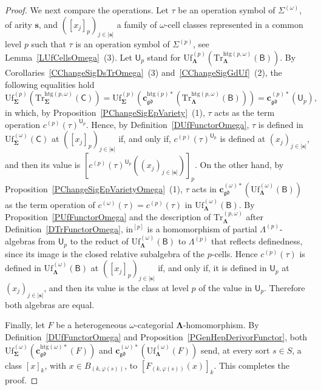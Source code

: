 \documentclass[a4paper, reqno]{amsbook}
\newcommand{\bb}[1]{\ensuremath{\lvert #1 \rvert}}
\newcommand{\sig}[1]{\mathbf{#1}}             %
\newcommand{\calg}[1]{\boldsymbol{\mathsf{#1}}} %
\newcommand{\gd}{\mathfrak{gd}}              %
\newcommand{\htg}{\mathrm{htg}}                %
\newcommand{\Uf}{\mathrm{Uf}}
\newcommand{\Tr}{\mathrm{Tr}}
\theoremstyle{plain}
\theoremstyle{definition}
\begin{document}
\begin{proof}
We next compare the operations.
Let $\tau$ be an operation symbol of $\Sigma^{(\omega)}$, of arity $\mathbf{s}$, and $([x_{j}]_{p})_{j\in\bb{\mathbf{s}}}$ a family of $\omega$-cell classes represented in a common level $p$ such that $\tau$ is an operation symbol of $\Sigma^{(p)}$, see Lemma~\ref{LUfCellsOmega}~(3).
Let $\calg{U}_{p}$ stand for $\Uf^{(p)}_{\sig{\Lambda}}(\Tr^{\htg(p,\omega)}_{\sig{\Lambda}}(\calg{B}))$.
By Corollaries~\ref{CChangeSigDsTrOmega}~(3) and~\ref{CChangeSigGdUf}~(2), the following equalities hold
$$
\Uf^{(p)}_{\sig{\Sigma}}\left(\Tr^{\htg(p,\omega)}_{\sig{\Sigma}}(\calg{C})\right)
=
\Uf^{(p)}_{\sig{\Sigma}}\left(\mathbf{c}^{\htg(p)\ast}_{\gd}\left(\Tr^{\htg(p,\omega)}_{\sig{\Lambda}}(\calg{B})\right)\right)
=
\mathbf{c}^{(p)\ast}_{\gd}(\calg{U}_{p}),
$$
in which, by Proposition~\ref{PChangeSigEpVariety}~(1), $\tau$ acts as the term operation $c^{(p)}(\tau)^{\calg{U}_{p}}$.
Hence, by Definition~\ref{DUfFunctorOmega}, $\tau$ is defined in $\Uf^{(\omega)}_{\sig{\Sigma}}(\calg{C})$ at $([x_{j}]_{p})_{j\in\bb{\mathbf{s}}}$ if, and only if, $c^{(p)}(\tau)^{\calg{U}_{p}}$ is defined at $(x_{j})_{j\in\bb{\mathbf{s}}}$, and then its value is $[c^{(p)}(\tau)^{\calg{U}_{p}}((x_{j})_{j\in\bb{\mathbf{s}}})]_{p}$.
On the other hand, by Proposition~\ref{PChangeSigEpVarietyOmega}~(1), $\tau$ acts in $\mathbf{c}^{(\omega)\ast}_{\gd}(\Uf^{(\omega)}_{\sig{\Lambda}}(\calg{B}))$ as the term operation of $c^{(\omega)}(\tau)=c^{(p)}(\tau)$ in $\Uf^{(\omega)}_{\sig{\Lambda}}(\calg{B})$.
By Proposition~\ref{PUfFunctorOmega} and the description of $\Tr^{(p,\omega)}_{\sig{\Lambda}}$ after Definition~\ref{DTrFunctorOmega}, $\mathrm{in}^{[p]}$ is a homomorphism of partial $\Lambda^{(p)}$-algebras from $\calg{U}_{p}$ to the reduct of $\Uf^{(\omega)}_{\sig{\Lambda}}(\calg{B})$ to $\Lambda^{(p)}$ that reflects definedness, since its image is the closed relative subalgebra of the $p$-cells.
Hence $c^{(p)}(\tau)$ is defined in $\Uf^{(\omega)}_{\sig{\Lambda}}(\calg{B})$ at $([x_{j}]_{p})_{j\in\bb{\mathbf{s}}}$ if, and only if, it is defined in $\calg{U}_{p}$ at $(x_{j})_{j\in\bb{\mathbf{s}}}$, and then its value is the class at level $p$ of the value in $\calg{U}_{p}$.
Therefore both algebras are equal.

Finally, let $F$ be a heterogeneous $\omega$-categorial $\sig{\Lambda}$-homomorphism.
By Definition~\ref{DUfFunctorOmega} and Proposition~\ref{PGenHepDerivorFunctor}, both $\Uf^{(\omega)}_{\sig{\Sigma}}(\mathbf{c}^{\htg(\omega)\ast}_{\gd}(F))$ and $\mathbf{c}^{(\omega)\ast}_{\gd}(\Uf^{(\omega)}_{\sig{\Lambda}}(F))$ send, at every sort $s\in S$, a class $[x]_{k}$, with $x\in B_{(k,\varphi(s))}$, to $[F_{(k,\varphi(s))}(x)]_{k}$. This completes the proof.
\end{proof}
\end{document}

